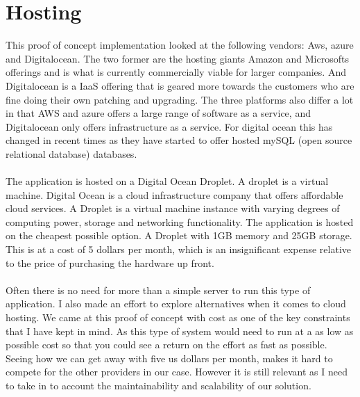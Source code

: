 \documentclass[]{uiophd}
\begin{document}
\section{Hosting}
This proof of concept implementation looked at the following vendors: Aws, azure and Digitalocean. The two former are the hosting giants Amazon and Microsofts offerings and is what is currently commercially viable for larger companies. And Digitalocean is a IaaS offering that is geared more towards the customers who are fine doing their own patching and upgrading. The three platforms also differ a lot in that AWS and azure offers a large range of software as a service, and Digitalocean only offers infrastructure as a service. For digital ocean this has changed in recent times as they have started to offer hosted mySQL (open source relational database) databases.
\\\\
The application is hosted on a Digital Ocean Droplet. A droplet is a virtual machine. Digital Ocean is a cloud infrastructure company that offers affordable cloud services. A Droplet is a virtual machine instance with varying degrees of computing power, storage and networking functionality. The application is hosted on the cheapest possible option. A Droplet with 1GB memory and 25GB storage. This is at a cost of 5 dollars per month, which is an insignificant expense relative to the price of purchasing the hardware up front. 
\\\\
Often there is no need for more than a simple server to run this type of application. I also made an effort to explore alternatives when it comes to cloud hosting. We came at this proof of concept with cost as one of the key constraints that I have kept in mind. As this type of system would need to run at a as low as possible cost so that you could see a return on the effort as fast as possible. Seeing how we can get away with five us dollars per month, makes it hard to compete for the other providers in our case. However it is still relevant as I need to take in to account the maintainability and scalability of our solution.
\end{document}
